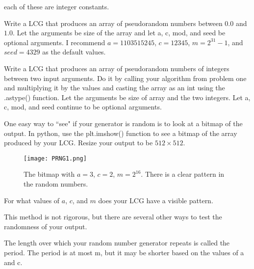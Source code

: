 each of these are integer constants.

\begin{problem}
Write a LCG that produces an array of pseudorandom numbers between $0.0$ and $1.0$.
Let the arguments be size of the array and let a, c, mod, and seed be optional arguments.
I recommend $a=1103515245$, $c=12345$, $m=2^{31}-1$, and $seed=4329$ as the default values.
\end{problem}

\begin{problem}
Write a LCG that produces an array of pseudorandom numbers of integers between two input arguments.
Do it by calling your algorithm from problem one and multiplying it by the values and casting the array as an int using the .astype() function.
Let the arguments be size of array and the two integers.
Let a, c, mod, and seed continue to be optional arguments.
\end{problem}

One easy way to ``see" if your generator is random is to look at a bitmap of the output.
In python, use the plt.imshow() function to see a bitmap of the array produced by your LCG.
Resize your output to be $512 \times 512$.

\begin{figure}
\texttt{[image: PRNG1.png]}
\caption{
The bitmap with $a=3$, $c=2$, $m=2^{16}$.
There is a clear pattern in the random numbers.}
\end{figure}

\begin{problem}
For what values of $a$, $c$, and $m$ does your LCG have a visible pattern.
\end{problem}

This method is not rigorous, but there are several other ways to test the randomness of your output.

The length over which your random number generator repeats is called the period.
The period is at most m, but it may be shorter based on the values of a and c.
 
\begin{comment}
According to the Hull-Dobell Theorem (TO DO: find a source), a LCG will have a full period if and only if, 
1. $c$ and $m$ are relatively prime,
2. $a-1$ is divisible by all prime factors of $m$,
3. $a-1$ is a multiple of 4 if $m$ is a multiple of 4

\begin{problem}
Test values of $a$,$c$, and $m$ that fit these requirements. 
\end{problem}
\end{comment}

